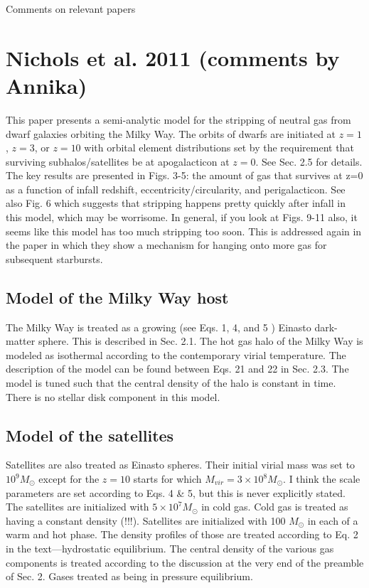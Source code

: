 \documentclass[11pt,longbibliography]{article}
\begin{document}
\noindent
\begin{centering}
\centerline{\Large{Comments on relevant papers}}\newline
\end{centering}
\vskip 0.3cm

\section{Nichols et al. 2011 (comments by Annika)}
This paper \citep{nichols2011} presents a semi-analytic model for the stripping of neutral gas from dwarf galaxies orbiting the Milky Way.  The orbits of dwarfs are initiated at $z=1$, $z=3$, or $z=10$ with orbital element distributions set by the requirement that surviving subhalos/satellites be at apogalacticon at $z=0$.  See Sec. 2.5 for details.  The key results are presented in Figs. 3-5: the amount of gas that survives at z=0 as a function of infall redshift, eccentricity/circularity, and perigalacticon.  See also Fig. 6 which suggests that stripping happens pretty quickly after infall in this model, which may be worrisome.  In general, if you look at Figs. 9-11 also, it seems like this model has too much stripping too soon.  This is addressed again in the \citet{nichols2012} paper in which they show a mechanism for hanging onto more gas for subsequent starbursts.

\subsection{Model of the Milky Way host}

The Milky Way is treated as a growing (see Eqs.  1, 4, and 5 ) Einasto dark-matter sphere.  This is described in Sec. 2.1.  The hot gas halo of the Milky Way is modeled as isothermal according to the contemporary virial temperature.  The description of the model can be found between Eqs. 21 and 22 in Sec. 2.3.  The model is tuned such that the central density of the halo is constant in time.  There is no stellar disk component in this model.

\subsection{Model of the satellites}
Satellites are also treated as Einasto spheres.  Their initial virial mass was set to $10^9 M_\odot$ except for the $z=10$ starts for which $M_{vir} = 3\times 10^8 M_\odot$.  I think the scale parameters are set according to Eqs. 4 \& 5, but this is never explicitly stated.  The satellites are initialized with $5\times 10^7 M_\odot$ in cold gas.  Cold gas is treated as having a constant density (!!!).  Satellites are initialized with 100 $M_\odot$ in each of a warm and hot phase.  The density profiles of those are treated according to Eq. 2 in the text---hydrostatic equilibrium.  The central density of the various gas components is treated according to the discussion at the very end of the preamble of Sec. 2.  Gases treated as being in pressure equilibrium.
\end{document}
